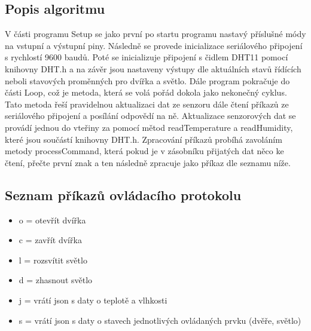 \subsection*{Popis algoritmu}
V části programu Setup se jako první po startu programu nastavý příslušné módy na vstupní a výstupní piny.
Následně se provede inicializace seriálového připojení s rychlostí 9600 baudů.
Poté se inicializuje připojení s čidlem DHT11 pomocí knihovny DHT.h a na závěr jsou nastaveny výstupy dle aktuálních stavů řídících neboli stavových proměnných pro dvířka a světlo.
Dále program pokračuje do části Loop, což je metoda, která se volá pořád dokola jako nekonečný cyklus.
Tato metoda řeší pravidelnou aktualizaci dat ze senzoru dále čtení příkazů ze seriálového připojení a posílání odpovědí na ně.
Aktualizace senzorových dat se provádí jednou do vteřiny za pomocí mětod readTemperature a readHumidity, které jsou součástí knihovny DHT.h.
Zpracování příkazů probíhá zavoláním metody processCommand, která pokud je v zásobníku přijatých dat něco ke čtení, přečte první znak a ten následně zpracuje jako příkaz dle seznamu níže.

\subsection*{Seznam příkazů ovládacího protokolu}
\begin{itemize}
    \item o = otevřít dvířka
    \item c = zavřít dvířka
    \item l = rozsvítit světlo
    \item d = zhasnout světlo
    \item j = vrátí json s daty o teplotě a vlhkosti
    \item s = vrátí json s daty o stavech jednotlivých ovládaných prvku (dvěře, světlo)
\end{itemize}

%
%
%
%